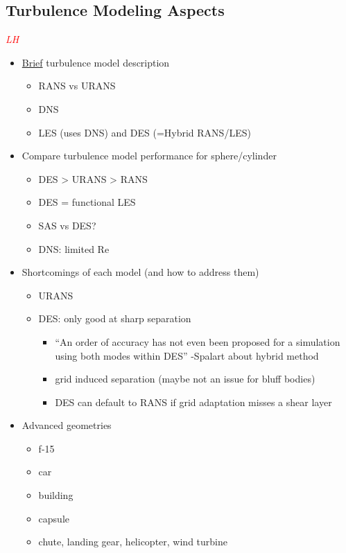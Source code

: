 \documentclass[journal]{new-aiaa}
\begin{document}
\subsection{Turbulence Modeling Aspects} \label{subsec:turbulencemodeling}

\textcolor{red}{\emph{LH}}

\begin{itemize}
    \item \underline{Brief} turbulence model description
    \begin{itemize}
        \item RANS vs URANS
        \item DNS
        \item LES (uses DNS) and DES (=Hybrid RANS/LES)
    \end{itemize}
    \item Compare turbulence model performance for sphere/cylinder
    \begin{itemize}
        \item DES > URANS > RANS
        \item DES = functional LES
        \item SAS vs DES?
        \item DNS: limited Re
    \end{itemize}
    \item Shortcomings of each model (and how to address them)
    \begin{itemize}
        \item URANS
        \item DES: only good at sharp separation
        \begin{itemize}
            \item ``An order of accuracy has not even been proposed for a simulation using both modes within DES'' -Spalart about hybrid method
            \item grid induced separation (maybe not an issue for bluff bodies)
            \item DES can default to RANS if grid adaptation misses a shear layer
    \end{itemize}
    \end{itemize}
    \item Advanced geometries
    \begin{itemize}
        \item f-15
        \item car
        \item building
        \item capsule
        \item chute, landing gear, helicopter, wind turbine
    \end{itemize}
\end{itemize}
\end{document}
